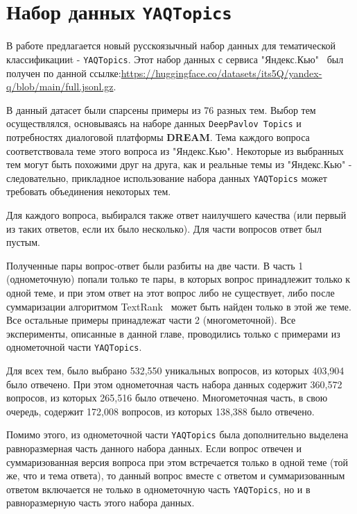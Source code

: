 \section{Набор данных \texttt{YAQTopics}} 

В работе предлагается новый русскоязычный набор данных для тематической классификацииt - \texttt{YAQTopics}. Этот набор данных с сервиса "Яндекс.Кью"~\cite{yandex_q} был получен по данной ссылке:\url{https://huggingface.co/datasets/its5Q/yandex-q/blob/main/full.jsonl.gz}.

В данный датасет были спарсены примеры из 76 разных тем. Выбор тем осуществлялся, основываясь на наборе данных \texttt{DeepPavlov Topics} и потребностях диалоговой платформы \textbf{DREAM}. Тема каждого вопроса соответствовала теме этого вопроса из "Яндекс.Кью". Некоторые из выбранных тем могут быть похожими друг на друга, как и реальные темы из "Яндекс.Кью" - следовательно, прикладное использование набора данных \texttt{YAQTopics} может требовать объединения некоторых тем. 

 Для каждого вопроса, выбирался также ответ наилучшего качества (или первый из таких ответов, если их было несколько). Для части вопросов ответ был пустым. 
 


Полученные пары вопрос-ответ были разбиты на две части. В часть 1 (однометочную) попали только те пары, в которых вопрос принадлежит только к одной теме, и при этом ответ на этот вопрос либо не существует, либо после суммаризации алгоритмом TextRank~\cite{summarizer} может быть найден только в этой же теме. Все остальные примеры принадлежат части 2 (многометочной). Все эксперименты, описанные в данной главе, проводились только с примерами из однометочной части \texttt{YAQTopics}.

Для всех тем, было выбрано 532,550 уникальных вопросов, из которых 403,904 было отвечено. При этом однометочная часть набора данных содержит 360,572 вопросов, из которых 265,516 было отвечено. Многометочная часть, в свою очередь, содержит 172,008 вопросов, из которых 138,388 было отвечено.

Помимо этого, из однометочной части \texttt{YAQTopics} была дополнительно выделена равноразмерная часть данного набора данных. Если вопрос отвечен и суммаризованная версия вопроса при этом встречается только в одной теме (той же, что и тема ответа), то данный вопрос вместе с ответом и суммаризованным ответом включается не только в однометочную часть \texttt{YAQTopics}, но и в равноразмерную часть этого набора данных. 
 
